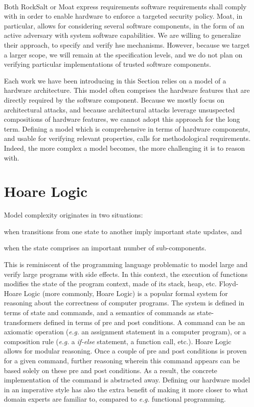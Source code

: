 \paragraph{}
%
Both RockSalt or Moat express requirements software requirements shall comply
with in order to enable hardware to enforce a targeted security policy.
%
Moat, in particular, allows for considering several software components, in the
form of an active adversary with system software capabilities.
%
We are willing to generalize their approach, to specify and verify \ac{hse}
mechanisms.
%
However, because we target a larger scope, we will remain at the specification
levels, and we do not plan on verifying particular implementations of trusted
software components.

Each work we have been introducing in this Section relies on a model of a
hardware architecture.
%
This model often comprises the hardware features that are directly required by
the software component.
%
Because we mostly focus on architectural attacks, and because architectural
attacks leverage unsuspected compositions of hardware features, we cannot adopt
this approach for the long term.
%
Defining a model which is comprehensive in terms of hardware components, and
usable for verifying relevant properties, calls for methodological
requirements.
%
Indeed, the more complex a model becomes, the more challenging it is to reason
with.

\section{Hoare Logic} %

Model complexity originates in two situations:
%
\begin{inparaenum}[(1)]
\item when transitions from one state to another imply important state updates,
  and
%
\item when the state comprises an important number of sub-components.
%
\end{inparaenum}
%
This is reminiscent of the programming language problematic to model large and
verify large programs with side effects.
%
In this context, the execution of functions modifies the state of the program
context, made of its stack, heap, etc.
%
Floyd-Hoare Logic (more commonly, Hoare Logic) is a popular formal system for
reasoning about the correctness of computer programs.
%
The system is defined in terms of state and commands, and a semantics of
commands as state-transformers defined in terms of pre and post conditions.
%
A command can be an axiomatic operation (\emph{e.g.} an assignment statement in
a computer program), or a composition rule (\emph{e.g.} a \emph{if-else}
statement, a function call, etc.).
%
Hoare Logic allows for modular reasoning.
%
Once a couple of pre and post conditions is proven for a given command, further
reasoning wherein this command appears can be based solely on these pre and post
conditions.
%
As a result, the concrete implementation of the command is abstracted away.
%
Defining our hardware model in an imperative style has also the extra benefit of
making it more closer to what domain experts are familiar to, compared to
\emph{e.g.} functional programming.

